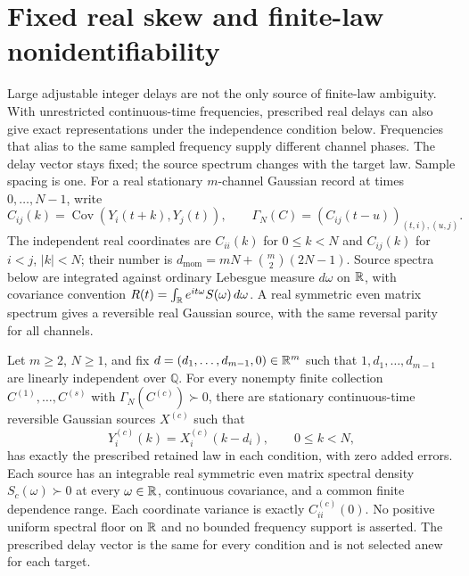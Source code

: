 \section{Fixed real skew and finite-law nonidentifiability}\label{sec:fractional}
Large adjustable integer delays are not the only source of finite-law ambiguity. With unrestricted continuous-time frequencies, prescribed real delays can also give exact representations under the independence condition below. Frequencies that alias to the same sampled frequency supply different channel phases. The delay vector stays fixed; the source spectrum changes with the target law. Sample spacing is one. For a real stationary $m$-channel Gaussian record
at times $0,\ldots,N-1$, write
\[
 C_{ij}(k)=\operatorname{Cov}(Y_i(t+k),Y_j(t)),\qquad
 \Gamma_N(C)=(C_{ij}(t-u))_{(t,i),(u,j)}.
\]
The independent real coordinates are $C_{ii}(k)$ for $0\le k<N$ and
$C_{ij}(k)$ for $i<j$, $|k|<N$; their number is
$d_{\mathrm{mom}}=mN+\binom m2(2N-1)$. Source spectra below are integrated against
ordinary Lebesgue measure $d\omega$ on $\mathbb R$, with covariance convention
$R(t)=\int_\mathbb R e^{it\omega}S(\omega)\,d\omega$.
A real symmetric even matrix spectrum gives a reversible real Gaussian
source, with the same reversal parity for all channels.

\begin{theorem}\label{thm:fractional}
Let $m\ge2$, $N\ge1$, and fix $d=(d_1,\ldots,d_{m-1},0)\in\mathbb R^m$
such that $1,d_1,\ldots,d_{m-1}$ are linearly independent over $\mathbb Q$.
For every nonempty finite collection $C^{(1)},\ldots,C^{(s)}$ with
$\Gamma_N(C^{(c)})\succ0$, there are stationary continuous-time reversible
Gaussian sources $X^{(c)}$ such that
\[
 Y_i^{(c)}(k)=X_i^{(c)}(k-d_i),\qquad 0\le k<N,
\]
has exactly the prescribed retained law in each condition, with zero
added errors. Each source has an integrable real symmetric even matrix
spectral density $S_c(\omega)\succ0$ at every $\omega\in\mathbb R$,
continuous covariance, and a common finite dependence range.
Each coordinate variance is exactly $C^{(c)}_{ii}(0)$.
No positive uniform spectral floor on $\mathbb R$ and no bounded frequency
support is asserted. The prescribed delay vector is the same for every
condition and is not selected anew for each target.
\end{theorem}


